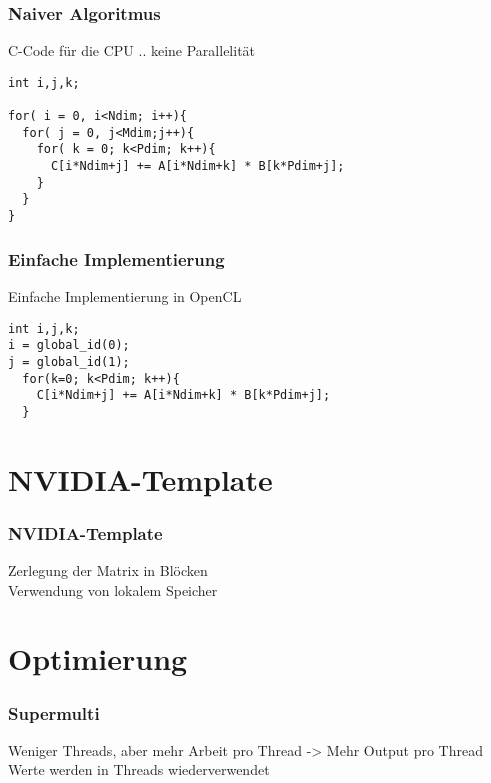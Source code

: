 \documentclass{beamer}
\begin{document}
\begin{frame}[fragile]
\frametitle{Naiver Algoritmus}

C-Code f\"ur die CPU .. keine Parallelit\"at

\begin{lstlisting}[style=customc,caption=Matrixmultiplication in C]
int i,j,k;

for( i = 0, i<Ndim; i++){
  for( j = 0, j<Mdim;j++){
    for( k = 0; k<Pdim; k++){
      C[i*Ndim+j] += A[i*Ndim+k] * B[k*Pdim+j]; 
    }
  }
}
\end{lstlisting}



\end{frame}



\begin{frame}[fragile]
\frametitle{Einfache Implementierung}
 
Einfache Implementierung in OpenCL
\begin{lstlisting}[style=customc,caption=Simplecode]
int i,j,k;
i = global_id(0);
j = global_id(1);
  for(k=0; k<Pdim; k++){
    C[i*Ndim+j] += A[i*Ndim+k] * B[k*Pdim+j]; 
  }
\end{lstlisting}



\end{frame}


\section{NVIDIA-Template}
\begin{frame}
\frametitle{NVIDIA-Template}

Zerlegung der Matrix in Bl\"ocken \\

Verwendung von lokalem Speicher \\


 

\end{frame}



\section{Optimierung}
\begin{frame}
\frametitle{Supermulti}

Weniger Threads, aber mehr Arbeit pro Thread -> Mehr Output pro Thread \\

Werte werden in Threads wiederverwendet


\end{frame}
\end{document}

